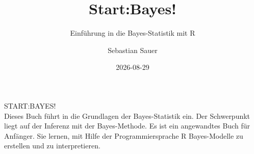\documentclass[
  ngerman,
  letterpaper,
  twoside,
  open=any]{scrbook}
\title{Start:Bayes!}
\subtitle{Einführung in die Bayes-Statistik mit R}
\author{Sebastian Sauer}
\date{2026-08-29}
\theoremstyle{definition}
\theoremstyle{plain}
\theoremstyle{definition}
\theoremstyle{definition}
\theoremstyle{definition}
\theoremstyle{definition}
\theoremstyle{remark}
\begin{document}

  \begin{frontmatter}



\begin{titlepage}
    \centering
    \vspace*{3cm}
    {\Huge START:BAYES!\\}
    \vspace*{2cm}
    \noindent %
Dieses Buch führt in die Grundlagen der Bayes-Statistik ein.
Der Schwerpunkt liegt auf der Inferenz mit der Bayes-Methode.
Es ist ein angewandtes Buch für Anfänger.
Sie lernen, mit Hilfe der Programmiersprache R Bayes-Modelle
zu erstellen und zu interpretieren.

    \vfill
\end{titlepage}


\newpage
\null
\thispagestyle{empty} %
\newpage



\begin{titlepage}


\newcommand{\titlepagepagealign}{
\ifthenelse{\equal{center}{right}}{\raggedleft}{}
\ifthenelse{\equal{center}{center}}{\centering}{}
\ifthenelse{\equal{center}{left}}{\raggedright}{}
}


\newcommand{\titleandsubtitle}{
{\fontsize{30}{36.0}\selectfont
{\uppercase{\nohyphens{Start:Bayes!}}}\par
}%

\vspace{\betweentitlesubtitle}
{
{\Large{\textit{\nohyphens{Einführung in die Bayes-Statistik mit
R}}}}\par
}}
\newcommand{\titlepagetitleblock}{
\rule{\textwidth}{0.4pt} %
\vspace{0.025\textheight} %

\titleandsubtitle

\vspace{0.025\textheight} 
\rule{0.3\textwidth}{0.4pt} %
}
\newcommand{\authorstyle}[1]{{\Large{#1}}}

\newcommand{\affiliationstyle}[1]{{\large{#1}}}

\newcommand{\titlepageauthorblock}{
{\authorstyle{\nohyphens{Sebastian Sauer}\\}}
}


\end{titlepage}
\end{frontmatter}
\end{document}
